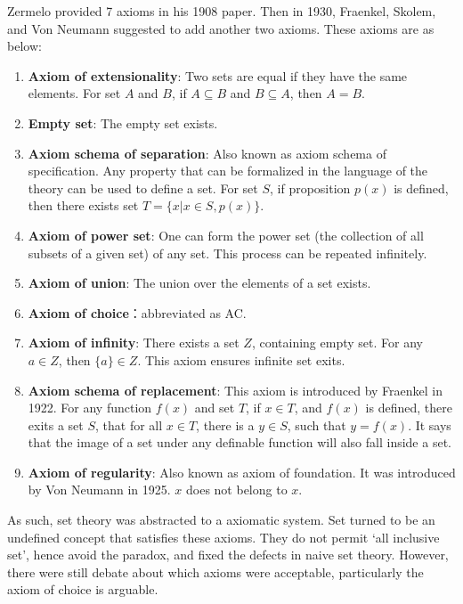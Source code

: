 \documentclass{article}
\begin{document}
Zermelo provided 7 axioms in his 1908 paper. Then in 1930, Fraenkel, Skolem, and Von Neumann suggested to add another two axioms. These axioms are as below:

\begin{enumerate}
\item \textbf{Axiom of extensionality}: Two sets are equal if they have the same elements. For set $A$ and $B$, if $A \subseteq B$ and $B \subseteq A$, then $A = B$.

\item \textbf{Empty set}: The empty set exists.

\item \textbf{Axiom schema of separation}: Also known as axiom schema of specification. Any property that can be formalized in the language of the theory can be used to define a set. For set $S$, if proposition $p(x)$ is defined, then there exists set $T = \{ x | x \in S, p(x)\}$.

\item \textbf{Axiom of power set}: One can form the power set (the collection of all subsets of a given set) of any set. This process can be repeated infinitely.

\item \textbf{Axiom of union}: The union over the elements of a set exists.

\item \textbf{Axiom of choice}：abbreviated as AC.

\item \textbf{Axiom of infinity}: There exists a set $Z$, containing empty set. For any $a \in Z$, then $\{a\} \in Z$. This axiom ensures infinite set exits.

\item \textbf{Axiom schema of replacement}: This axiom is introduced by Fraenkel in 1922. For any function $f(x)$ and set $T$, if $x \in T$, and $f(x)$ is defined, there exits a set $S$, that for all $x \in T$, there is a $y \in S$, such that $y = f(x)$. It says that the image of a set under any definable function will also fall inside a set.

\item \textbf{Axiom of regularity}: Also known as axiom of foundation. It was introduced by Von Neumann in 1925. $x$ does not belong to $x$.
\end{enumerate}

As such, set theory was abstracted to a axiomatic system. Set turned to be an undefined concept that satisfies these axioms. They do not permit `all inclusive set', hence avoid the paradox, and fixed the defects in naive set theory. However, there were still debate about which axioms were acceptable, particularly the axiom of choice is arguable.
\end{document}
